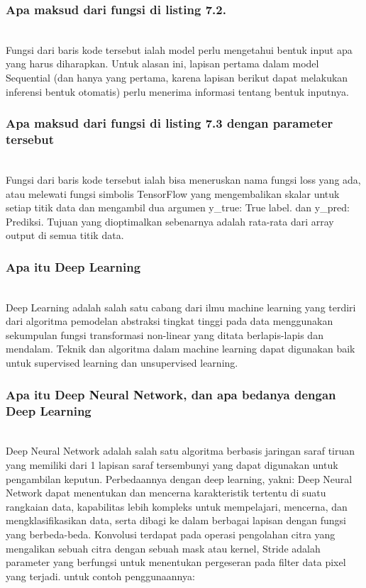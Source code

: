 	\subsubsection{Apa maksud dari fungsi di listing 7.2.}
	\hfill\\
Fungsi dari baris kode tersebut ialah model perlu mengetahui bentuk input apa yang harus diharapkan. Untuk alasan ini, lapisan pertama dalam model Sequential (dan hanya yang pertama, karena lapisan berikut dapat melakukan inferensi bentuk otomatis) perlu menerima informasi tentang bentuk inputnya.

	\subsubsection{Apa maksud dari fungsi di listing 7.3 dengan parameter tersebut}
	\hfill\\
Fungsi dari baris kode tersebut ialah bisa meneruskan nama fungsi loss yang ada, atau melewati fungsi simbolis TensorFlow yang mengembalikan skalar untuk setiap titik data dan mengambil dua argumen y\_true: True label. dan  y\_pred: Prediksi. Tujuan yang dioptimalkan sebenarnya adalah rata-rata dari array output di semua titik data.
	
	\subsubsection{Apa itu Deep Learning}
	\hfill\\
Deep Learning adalah salah satu cabang dari ilmu machine learning yang terdiri dari algoritma pemodelan abstraksi tingkat tinggi pada data menggunakan sekumpulan fungsi transformasi non-linear yang ditata berlapis-lapis dan mendalam. Teknik dan algoritma dalam machine learning dapat digunakan baik untuk supervised learning dan unsupervised learning.
	
	\subsubsection{Apa itu Deep Neural Network, dan apa bedanya dengan Deep Learning}
	\hfill\\
Deep Neural Network adalah salah satu algoritma berbasis jaringan saraf tiruan yang memiliki dari 1 lapisan saraf tersembunyi yang dapat digunakan untuk pengambilan keputun. Perbedaannya dengan deep learning, yakni: Deep Neural Network dapat menentukan dan mencerna karakteristik tertentu di suatu rangkaian data, kapabilitas lebih kompleks untuk mempelajari, mencerna, dan mengklasifikasikan data, serta dibagi ke dalam berbagai lapisan dengan fungsi yang berbeda-beda.
Konvolusi terdapat pada operasi pengolahan citra yang mengalikan sebuah citra dengan sebuah mask atau kernel, Stride adalah parameter yang berfungsi untuk menentukan pergeseran pada filter data pixel yang terjadi. untuk contoh penggunaannya:
	
